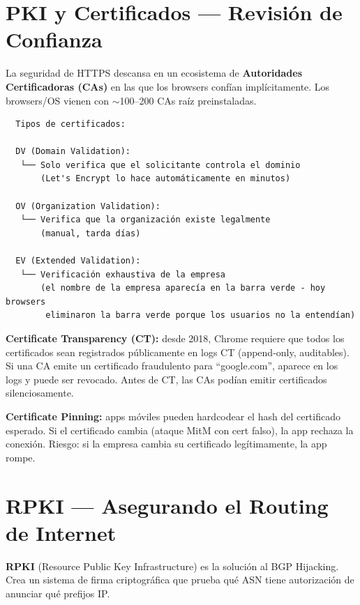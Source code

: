 \section{ PKI y Certificados --- Revisión de Confianza}

\begin{concepto}
La seguridad de HTTPS descansa en un ecosistema de \textbf{Autoridades
Certificadoras (CAs)} en las que los browsers confían implícitamente.
Los browsers/OS vienen con $\sim$100--200 CAs raíz preinstaladas.
\end{concepto}

\begin{lstlisting}
  Tipos de certificados:

  DV (Domain Validation):
   └── Solo verifica que el solicitante controla el dominio
       (Let's Encrypt lo hace automáticamente en minutos)

  OV (Organization Validation):
   └── Verifica que la organización existe legalmente
       (manual, tarda días)

  EV (Extended Validation):
   └── Verificación exhaustiva de la empresa
       (el nombre de la empresa aparecía en la barra verde - hoy browsers
        eliminaron la barra verde porque los usuarios no la entendían)
\end{lstlisting}

\begin{cuidado}
\textbf{Certificate Transparency (CT):} desde 2018, Chrome requiere que
todos los certificados sean registrados públicamente en logs CT (append-only,
auditables). Si una CA emite un certificado fraudulento para ``google.com'',
aparece en los logs y puede ser revocado. Antes de CT, las CAs podían emitir
certificados silenciosamente.

\textbf{Certificate Pinning:} apps móviles pueden hardcodear el hash del
certificado esperado. Si el certificado cambia (ataque MitM con cert falso),
la app rechaza la conexión. Riesgo: si la empresa cambia su certificado
legítimamente, la app rompe.
\end{cuidado}

\section{ RPKI --- Asegurando el Routing de Internet}

\begin{concepto}
\textbf{RPKI} (Resource Public Key Infrastructure) es la solución al BGP
Hijacking. Crea un sistema de firma criptográfica que prueba qué ASN tiene
autorización de anunciar qué prefijos IP.
\end{concepto}

